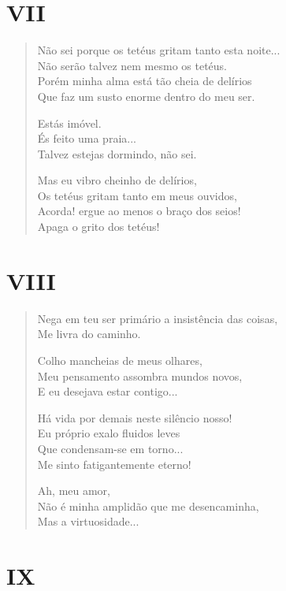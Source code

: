 \pagebreak
\section{VII}

\begin{verse}
Não sei porque os tetéus gritam tanto esta noite...\\
Não serão talvez nem mesmo os tetéus.\\
Porém minha alma está tão cheia de delírios\\
Que faz um susto enorme dentro do meu ser.

Estás imóvel.\\
És feito uma praia...\\
Talvez estejas dormindo, não sei.

Mas eu vibro cheinho de delírios,\\
Os tetéus gritam tanto em meus ouvidos,\\
Acorda! ergue ao menos o braço dos seios!\\
Apaga o grito dos tetéus!
\end{verse}

\pagebreak
\section{VIII}

\begin{verse}
Nega em teu ser primário a insistência das coisas,\\
Me livra do caminho.

Colho mancheias de meus olhares,\\
Meu pensamento assombra mundos novos,\\
E eu desejava estar contigo...

Há vida por demais neste silêncio nosso!\\
Eu próprio exalo fluidos leves\\
Que condensam-se em torno...\\
Me sinto fatigantemente eterno!

Ah, meu amor,\\
Não é minha amplidão que me desencaminha,\\
Mas a virtuosidade...
\end{verse}

\pagebreak
\section{IX}

